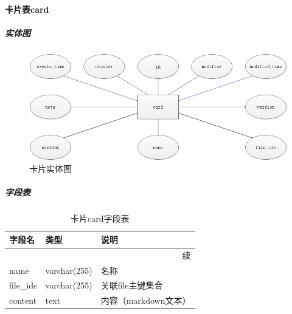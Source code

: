 \documentclass[titlepage,UTF8,linespread=1.5]{ctexart}
\begin{document}
\paragraph{卡片表card}
\subparagraph{实体图}
\begin{figure}[H]
    \centering
    \includegraphics[width=140mm]{entity-card.png}
    \caption{卡片实体图}
    \label{fig:entity-card}
\end{figure}
\subparagraph{字段表}
\begin{longtable}{|p{10em}|p{6em}|p{15em}|}
    \caption{卡片card字段表}\label{tab:table_card}       \\\hline
    字段名         & 类型         & 说明                 \\\hline
    \endfirsthead
    \multicolumn{3}{r}{{续\tablename\thetable{}}}        \\\hline
    \endhead
    name           & varchar(255) & 名称                 \\\hline
    file\_ids      & varchar(255) & 关联file主键集合     \\\hline
    content        & text         & 内容（markdown文本） \\\hline
\end{longtable}\par
\end{document}
